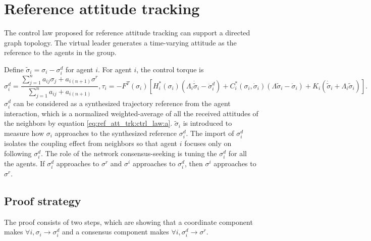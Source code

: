 \section{Reference attitude tracking}
\label{sec:ref_att_trk}

The control law proposed for reference attitude tracking can support a directed graph topology.
The virtual leader generates a time-varying attitude as the reference to the agents in the group.

Define $ \tilde{\sigma}_{i} = \sigma_{i} - \sigma^{d}_{i} $ for agent $ i $.
For agent $ i $, the control torque is 
\begin{subequations}
\label{eq:ref_att_trk:ctrl_law}
\begin{equation}
\label{eq:ref_att_trk:ctrl_law:a}
\sigma^{d}_{i} = \frac{ \sum_{j=1}^{n} a_{ij} \sigma_{j} + a_{i(n+1)} \sigma^{r} }{ \sum_{j=1}^{n} a_{ij} + a_{i(n+1)} },
\end{equation}
\begin{equation}
\label{eq:ref_att_trk:ctrl_law:b}
\tau_{i} = - F^{T} ( \sigma_{i} ) \left[ H^{*}_{i} ( \sigma_{i} ) ( \Lambda_{i} \dot{\tilde{\sigma}}_{i} - \ddot{\sigma}^{d}_{i} )
+ C^{*}_{i} ( \sigma_{i}, \dot{ \sigma }_{i} ) ( \Lambda \tilde{\sigma}_{i} - \dot{\sigma}_{i} ) + K_{i} ( \dot{\tilde{\sigma}}_{i} + \Lambda_{i} \tilde{\sigma}_{i} ) \right].
\end{equation}
\end{subequations}
$ \sigma^{d}_{i} $ can be considered as a synthesized trajectory reference from the agent interaction, which is a normalized weighted-average of all the received attitudes of the neighbors by equation \eqref{eq:ref_att_trk:ctrl_law:a}.
$ \tilde{\sigma}_{i} $ is introduced to measure how $ \sigma_{i} $ approaches to the synthesized reference $ \sigma^{d}_{i} $.
The import of $ \sigma^{d}_{i} $ isolates the coupling effect from neighbors so that agent $ i $ focuses only on following $ \sigma^{d}_{i} $.
The role of the network consensus-seeking is tuning the $ \sigma^{d}_{i} $ for all the agents. 
If $ \sigma^{d}_{i} $ approaches to $ \sigma^{r} $ and $ \sigma^{i} $ approaches to $ \sigma^{d}_{i} $, then $ \sigma^{i} $ approaches to $ \sigma^{r} $.
 
\subsection{Proof strategy}
\label{sec:ref_att_trk:proof}

The proof consists of two steps, which are showing that a coordinate component makes $ \forall i, \sigma_{i} \rightarrow \sigma^{d}_{i} $ and a consensus component makes $ \forall i, \sigma^{d}_{i} \rightarrow \sigma^{r} $.

